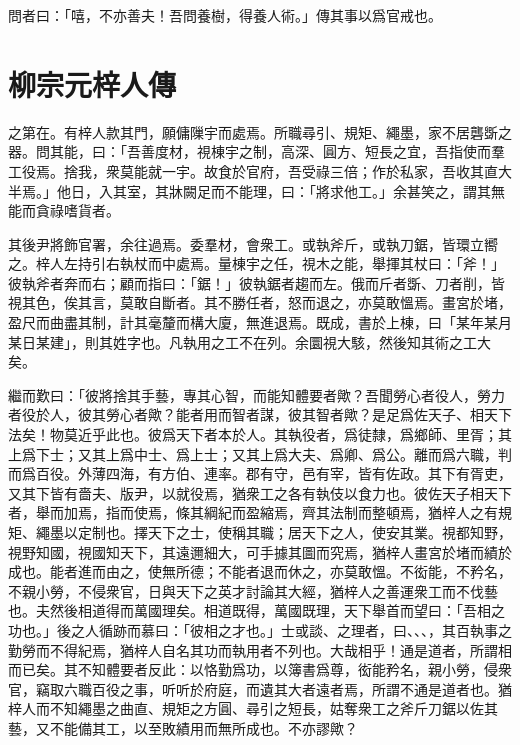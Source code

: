 問者曰：「嘻，不亦善夫！吾問養樹，得養人術。」傳其事以爲官戒也。

\theendnotes

\section[梓人傳\quad{\small 柳宗元}]{{\normalsize 柳宗元}\quad 梓人傳}
之第在。有梓人款其門，願傭隟宇而處焉。所職尋引、規矩、繩墨，家不居礱斲之器。問其能，曰：「吾善度材，視棟宇之制，高深、圓方、短長之宜，吾指使而羣工役焉。捨我，衆莫能就一宇。故食於官府，吾受祿三倍；作於私家，吾收其直大半焉。」他日，入其室，其牀闕足而不能理，曰：「將求他工。」余甚笑之，謂其無能而貪祿嗜貨者。

其後尹將飾官署，余往過焉。委羣材，會衆工。或執斧斤，或執刀鋸，皆環立嚮之。梓人左持引右執杖而中處焉。量棟宇之任，視木之能，舉揮其杖曰：「斧！」彼執斧者奔而右；顧而指曰：「鋸！」彼執鋸者趨而左。俄而斤者斲、刀者削，皆視其色，俟其言，莫敢自斷者。其不勝任者，怒而退之，亦莫敢慍焉。畫宮於堵，盈尺而曲盡其制，計其毫釐而構大廈，無進退焉。既成，書於上棟，曰「某年某月某日某建」，則其姓字也。凡執用之工不在列。余圜視大駭，然後知其術之工大矣。

繼而歎曰：「彼將捨其手藝，專其心智，而能知體要者歟？吾聞勞心者役人，勞力者役於人，彼其勞心者歟？能者用而智者謀，彼其智者歟？是足爲佐天子、相天下法矣！物莫近乎此也。彼爲天下者本於人。其執役者，爲徒隸，爲鄉師、里胥；其上爲下士；又其上爲中士、爲上士；又其上爲大夫、爲卿、爲公。離而爲六職，判而爲百役。外薄四海，有方伯、連率。郡有守，邑有宰，皆有佐政。其下有胥吏，又其下皆有嗇夫、版尹，以就役焉，猶衆工之各有執伎以食力也。彼佐天子相天下者，舉而加焉，指而使焉，條其綱紀而盈縮焉，齊其法制而整頓焉，猶梓人之有規矩、繩墨以定制也。擇天下之士，使稱其職；居天下之人，使安其業。視都知野，視野知國，視國知天下，其遠邇細大，可手據其圖而究焉，猶梓人畫宮於堵而績於成也。能者進而由之，使無所德；不能者退而休之，亦莫敢慍。不衒能，不矜名，不親小勞，不侵衆官，日與天下之英才討論其大經，猶梓人之善運衆工而不伐藝也。夫然後相道得而萬國理矣。相道既得，萬國既理，天下舉首而望曰：「吾相之功也。」後之人循跡而慕曰：「彼相之才也。」士或談、之理者，曰、、、，其百執事之勤勞而不得紀焉，猶梓人自名其功而執用者不列也。大哉相乎！通是道者，所謂相而已矣。其不知體要者反此：以恪勤爲功，以簿書爲尊，衒能矜名，親小勞，侵衆官，竊取六職百役之事，听听於府庭，而遺其大者遠者焉，所謂不通是道者也。猶梓人而不知繩墨之曲直、規矩之方圓、尋引之短長，姑奪衆工之斧斤刀鋸以佐其藝，又不能備其工，以至敗績用而無所成也。不亦謬歟？

